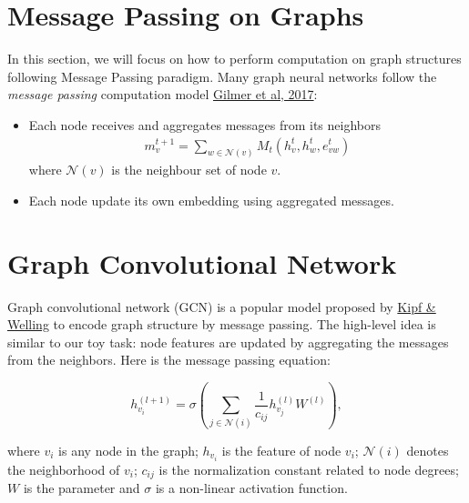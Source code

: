 \section{Message Passing on Graphs}
 In this section, we will focus on how to perform computation on graph structures following Message Passing paradigm. Many graph neural networks follow the \textit{message passing} computation model \href{https://arxiv.org/abs/1704.01212}{Gilmer et al, 2017}:
\begin{itemize}
    \item Each node receives and aggregates messages from its neighbors  
\begin{gather}
m_v^{t+1} = \sum\limits_{w\in \mathcal{N}(v)}M_t(h_v^t, h_w^t, e_{vw}^t)
\end{gather}
where $\mathcal{N}(v)$ is the neighbour set of node $v$.

\item Each node update its own embedding using aggregated messages.
\end{itemize}




\section{Graph Convolutional Network}

Graph convolutional network (GCN) is a popular model proposed by \href{https://arxiv.org/abs/1609.02907}{Kipf \& Welling} to encode graph structure by message passing. The high-level idea is similar to our toy task: node features are updated by aggregating the messages from the neighbors. Here is the message passing equation:

$$
h_{v_i}^{(l+1)} = \sigma \left(\sum_{j\in\mathcal{N}(i)}\frac{1}{c_{ij}}h_{v_j}^{(l)}W^{(l)} \right),
$$

where $v_i$ is any node in the graph; $h_{v_i}$ is the feature of node $v_i$; $\mathcal{N}(i)$ denotes the neighborhood of $v_i$; $c_{ij}$ is the normalization constant related to node degrees; $W$ is the parameter and $\sigma$ is a non-linear activation function.
